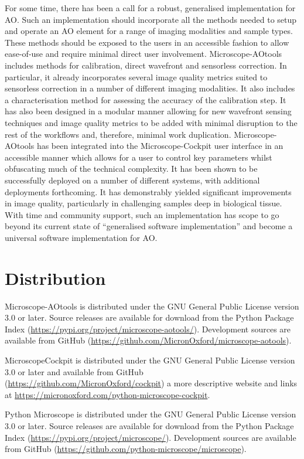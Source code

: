 For some time, there has been a call for a robust, generalised implementation 
for AO. Such an implementation should incorporate all the methods needed to
setup and operate an AO element for a range of imaging modalities and sample 
types. These methods should be exposed to the users in an accessible fashion 
to allow ease-of-use and require minimal direct user involvement. 
Microscope-AOtools includes methods for calibration, direct wavefront and 
sensorless correction. In particular, it already incorporates several image 
quality metrics suited to sensorless correction in a number of different 
imaging modalities. It also includes a characterisation method for assessing 
the accuracy of the calibration step. It has also been designed in a modular 
manner allowing for new wavefront sensing techniques and image quality 
metrics to be added with minimal disruption to the rest of the workflows and, 
therefore, minimal work duplication. Microscope-AOtools has been integrated 
into the Microscope-Cockpit user interface in an accessible manner which 
allows for a user to control key parameters whilst obfuscating much of the 
technical complexity. It has been shown to be successfully deployed on a 
number of different systems, with additional deployments forthcoming. It has 
demonstrably yielded significant improvements in image quality, particularly 
in challenging samples deep in biological tissue. With  time and community 
support, such an implementation has scope to go beyond its  current state of 
``generalised software implementation'' and become a universal software 
implementation for AO.

\section{Distribution}
\label{sec:distribution}

Microscope-AOtools is distributed under the GNU General Public License version 3.0 or later. Source releases are available for download from the Python Package Index (\url{https://pypi.org/project/microscope-aotools/}). Development sources are available from GitHub (\url{https://github.com/MicronOxford/microscope-aotools}).

MicroscopeCockpit is distributed under the GNU General Public License version 3.0 or later and available from GitHub (\url{https://github.com/MicronOxford/cockpit}) a more descriptive website and links at \url{https://micronoxford.com/python-microscope-cockpit}. 

Python Microscope is distributed under the GNU General Public License version 3.0 or later. Source releases are available for download from the Python Package Index (\url{https://pypi.org/project/microscope/}). Development sources are available from GitHub (\url{https://github.com/python-microscope/microscope}).
